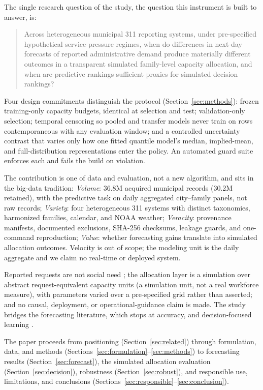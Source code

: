 The single research question of the study, the question this
instrument is built to answer, is:

\begin{quote}
Across heterogeneous municipal 311 reporting systems, under pre-specified
hypothetical service-pressure regimes, when do differences in next-day
forecasts of reported administrative demand produce materially different
outcomes in a transparent simulated family-level capacity allocation, and
when are predictive rankings sufficient proxies for simulated decision
rankings?
\end{quote}

Four design commitments distinguish the protocol
(Section~\ref{sec:methods}): frozen training-only capacity budgets,
identical at selection and test; validation-only selection; temporal
censoring so pooled and transfer models never train on rows
contemporaneous with any evaluation window; and a controlled uncertainty
contrast that varies only how one fitted quantile model's median,
implied-mean, and full-distribution representations enter the policy. An
automated guard suite enforces each and fails the build on violation.

The contribution is one of data and evaluation, not a new algorithm, and
sits in the big-data tradition: \emph{Volume}: 36.8M acquired municipal
records (30.2M retained), with the predictive task on daily aggregated
city--family panels, not raw records; \emph{Variety}: four heterogeneous
311 systems with distinct taxonomies, harmonized families, calendar, and
NOAA weather; \emph{Veracity}: provenance manifests, documented
exclusions, SHA-256 checksums, leakage guards, and one-command
reproduction; \emph{Value}: whether forecasting gains translate into
simulated allocation outcomes. Velocity is out of scope; the modeling
unit is the daily aggregate and we claim no real-time or deployed
system.

Reported requests are not social need \citep{kontokosta2021bias}; the
allocation layer is a simulation over abstract request-equivalent
capacity units (a simulation unit, not a real workforce measure), with
parameters varied over a pre-specified grid rather than asserted; and no
causal, deployment, or operational-guidance claim is made. The study bridges the forecasting
literature, which stops at accuracy, and decision-focused learning
\citep{elmachtoub2022smart, mandi2024decision}.

The paper proceeds from positioning (Section~\ref{sec:related}) through formulation,
data, and methods (Sections~\ref{sec:formulation}--\ref{sec:methods}) to forecasting results (Section~\ref{sec:forecast}),
the simulated allocation evaluation (Section~\ref{sec:decision}), robustness
(Section~\ref{sec:robust}), and responsible use, limitations, and conclusions
(Sections~\ref{sec:responsible}--\ref{sec:conclusion}).
